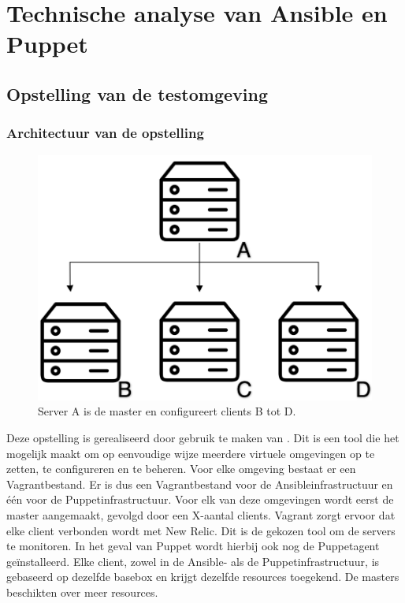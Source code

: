 
\section{Technische analyse van Ansible en Puppet}
\label{sec:technischeanalyse}
\subsection{Opstelling van de testomgeving}
\label{sec:opstellingtestevn}
\subsubsection{Architectuur van de opstelling}


\begin{figure}
	\includegraphics[width=0.9\linewidth]{img/infrastructruur.png} 
	\caption{Server A is de master en configureert clients B tot D.}
	\label{fig:infrastructuur}
\end{figure}


Deze opstelling is gerealiseerd door gebruik te maken van \textcite{whatisvagrant}. Dit is een tool die het mogelijk maakt om op eenvoudige wijze meerdere virtuele omgevingen op te zetten, te configureren en te beheren.  Voor elke omgeving bestaat er een Vagrantbestand. Er is dus een Vagrantbestand voor de Ansibleinfrastructuur en \'e\'en voor de Puppetinfrastructuur. Voor elk van deze omgevingen wordt eerst de master aangemaakt, gevolgd door een X-aantal clients. Vagrant zorgt ervoor dat elke client  verbonden wordt met New Relic. Dit is de gekozen tool om de servers te monitoren. In het geval van Puppet wordt hierbij ook nog de Puppetagent ge\"installeerd. Elke client, zowel in de Ansible- als de Puppetinfrastructuur, is gebaseerd op dezelfde basebox en krijgt dezelfde resources toegekend. De masters beschikten over meer resources.

